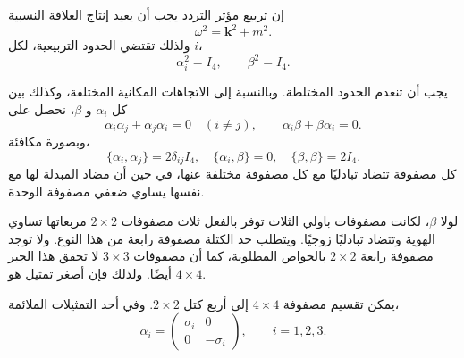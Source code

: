 \begin{classroomqa}
\end{classroomqa}

إن تربيع مؤثر التردد يجب أن يعيد إنتاج العلاقة النسبية
\begin{equation}
\omega^2=\mathbf{k}^2+m^2.
\end{equation}
ولذلك تقتضي الحدود التربيعية، لكل \(i\)،
\begin{equation}
\alpha_i^2=I_4,
\qquad
\beta^2=I_4.
\end{equation}

\begin{classroomqa}
\end{classroomqa}

يجب أن تنعدم الحدود المختلطة. وبالنسبة إلى الاتجاهات المكانية المختلفة، وكذلك بين كل \(\alpha_i\) و \(\beta\)، نحصل على
\begin{equation}
\alpha_i\alpha_j+\alpha_j\alpha_i=0
\quad (i\neq j),
\qquad
\alpha_i\beta+\beta\alpha_i=0.
\end{equation}
وبصورة مكافئة،
\begin{equation}
\{\alpha_i,\alpha_j\}=2\delta_{ij}I_4,
\quad
\{\alpha_i,\beta\}=0,
\quad
\{\beta,\beta\}=2I_4.
\end{equation}
كل مصفوفة تتضاد تبادليًا مع كل مصفوفة مختلفة عنها، في حين أن مضاد المبدلة لها مع نفسها يساوي ضعفي مصفوفة الوحدة.

لولا \(\beta\)، لكانت مصفوفات باولي الثلاث توفر بالفعل ثلاث مصفوفات \(2\times2\) مربعاتها تساوي الهوية وتتضاد تبادليًا زوجيًا. ويتطلب حد الكتلة مصفوفة رابعة من هذا النوع. ولا توجد مصفوفة رابعة \(2\times2\) بالخواص المطلوبة، كما أن مصفوفات \(3\times3\) لا تحقق هذا الجبر أيضًا. ولذلك فإن أصغر تمثيل هو \(4\times4\).

يمكن تقسيم مصفوفة \(4\times4\) إلى أربع كتل \(2\times2\). وفي أحد التمثيلات الملائمة،
\begin{equation}
\alpha_i=
\begin{pmatrix}
\sigma_i&0\\
0&-\sigma_i
\end{pmatrix},
\qquad i=1,2,3.
\end{equation}

